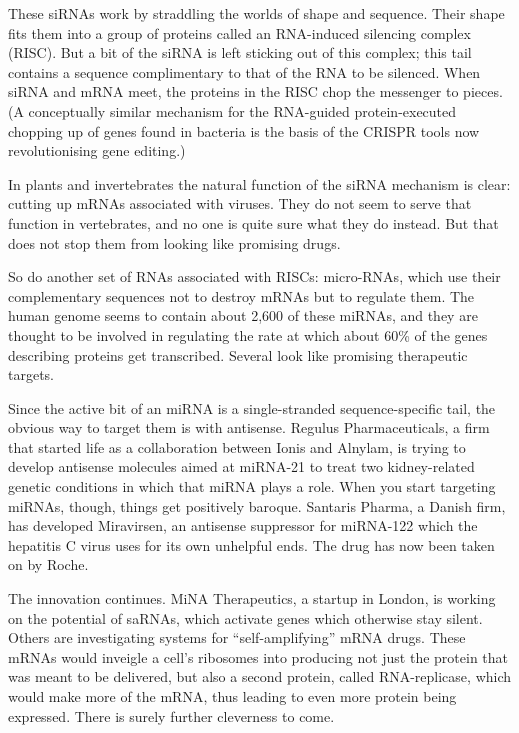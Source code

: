 \documentclass{article}
\begin{document}
These siRNAs work by straddling the worlds of shape and sequence. Their shape fits them into a group of proteins called an RNA-induced silencing complex (RISC). But a bit of the siRNA is left sticking out of this complex; this tail contains a sequence complimentary to that of the RNA to be silenced. When siRNA and mRNA meet, the proteins in the RISC chop the messenger to pieces. (A conceptually similar mechanism for the RNA-guided protein-executed chopping up of genes found in bacteria is the basis of the CRISPR tools now revolutionising gene editing.) 

In plants and invertebrates the natural function of the siRNA mechanism is clear: cutting up mRNAs associated with viruses. They do not seem to serve that function in vertebrates, and no one is quite sure what they do instead. But that does not stop them from looking like promising drugs. 

So do another set of RNAs associated with RISCs: micro-RNAs, which use their complementary sequences not to destroy mRNAs but to regulate them. The human genome seems to contain about 2,600 of these miRNAs, and they are thought to be involved in regulating the rate at which about 60\% of the genes describing proteins get transcribed. Several look like promising therapeutic targets. 

Since the active bit of an miRNA is a single-stranded sequence-specific tail, the obvious way to target them is with antisense. Regulus Pharmaceuticals, a firm that started life as a collaboration between Ionis and Alnylam, is trying to develop antisense molecules aimed at miRNA-21 to treat two kidney-related genetic conditions in which that miRNA plays a role. When you start targeting miRNAs, though, things get positively baroque. Santaris Pharma, a Danish firm, has developed Miravirsen, an antisense suppressor for miRNA-122 which the hepatitis C virus uses for its own unhelpful ends. The drug has now been taken on by Roche. 

The innovation continues. MiNA Therapeutics, a startup in London, is working on the potential of saRNAs, which activate genes which otherwise stay silent. Others are investigating systems for ``self-amplifying'' mRNA drugs. These mRNAs would inveigle a cell's ribosomes into producing not just the protein that was meant to be delivered, but also a second protein, called RNA-replicase, which would make more of the mRNA, thus leading to even more protein being expressed. There is surely further cleverness to come. 
\end{document}
